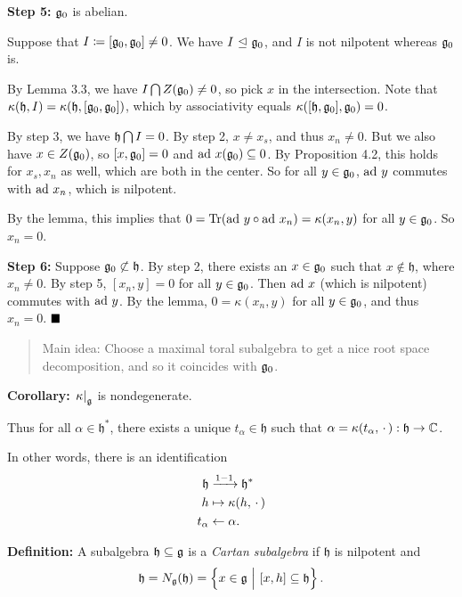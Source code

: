 \textbf{Step 5:} \({\mathfrak{g}}_0\) is abelian.

Suppose that \(I \coloneqq [{\mathfrak{g}}_0, {\mathfrak{g}}_0] \neq 0\). We have
\(I {~\trianglelefteq~} {\mathfrak{g}}_0\), and \(I\) is not nilpotent whereas \({\mathfrak{g}}_0\)
is.

By Lemma 3.3, we have \(I \bigcap Z({\mathfrak{g}}_0) \neq 0\), so pick \(x\)
in the intersection. Note that
\(\kappa(\mathfrak h, I) = \kappa(\mathfrak h, [{\mathfrak{g}}_0, {\mathfrak{g}}_0])\),
which by associativity equals
\(\kappa([\mathfrak h, {\mathfrak{g}}_0], {\mathfrak{g}}_0) = 0\).

By step 3, we have \(\mathfrak h \bigcap I = 0\). By step 2,
\(x\neq x_s\), and thus \(x_n \neq 0\). But we also have
\(x\in Z({\mathfrak{g}}_0)\), so \([x, {\mathfrak{g}}_0] = 0\) and
\(\mathrm{ad}~ x({\mathfrak{g}}_0) \subseteq 0\). By Proposition 4.2, this holds for
\(x_s, x_n\) as well, which are both in the center. So for all
\(y\in {\mathfrak{g}}_0\), \(\mathrm{ad}~ y\) commutes with \(\mathrm{ad}~ x_n\), which is
nilpotent.

By the lemma, this implies that
\(0 = \mathrm{Tr}(\mathrm{ad}~ y \circ \mathrm{ad}~ x_n) = \kappa(x_n, y)\) for all
\(y\in {\mathfrak{g}}_0\). So \(x_n = 0\).

\textbf{Step 6:} Suppose \({\mathfrak{g}}_0 \not\subset \mathfrak h\). By step 2,
there exists an \(x\in {\mathfrak{g}}_0\) such that \(x\not\in\mathfrak h\),
where \(x_n \neq 0\). By step 5, \([x_n, y] = 0\) for all
\(y\in{\mathfrak{g}}_0\). Then \(\mathrm{ad}~ x\) (which is nilpotent) commutes with
\(\mathrm{ad}~ y\). By the lemma, \(0 = \kappa(x_n, y)\) for all \(y\in{\mathfrak{g}}_0\),
and thus \(x_n = 0\). \(\qed\)

\begin{quote}
Main idea: Choose a maximal toral subalgebra to get a nice root space
decomposition, and so it coincides with \({\mathfrak{g}}_0\).
\end{quote}

\textbf{Corollary:} \({\left.{\kappa}\right|_{{\mathfrak{g}}}}\) is nondegenerate.

Thus for all \(\alpha \in \mathfrak h^*\), there exists a unique
\(t_\alpha \in \mathfrak h\) such that
\(\alpha = \kappa(t_\alpha, {\,\cdot\,}): \mathfrak h \to {\mathbb{C}}\).

In other words, there is an identification \begin{align*}
\mathfrak h &\xrightarrow{1-1} \mathfrak h^* \\
h &\mapsto \kappa(h, {\,\cdot\,}) \\
t_\alpha &\leftarrow \alpha
.\end{align*}

\textbf{Definition:} A subalgebra \(\mathfrak h \subseteq {\mathfrak{g}}\) is a
\emph{Cartan subalgebra} if \(\mathfrak h\) is nilpotent and \[
\mathfrak h = N_{\mathfrak{g}}(\mathfrak h) = \left\{{x\in {\mathfrak{g}} {~\mathrel{\Big|}~} [x, h] \subseteq \mathfrak h}\right\}.
\]

